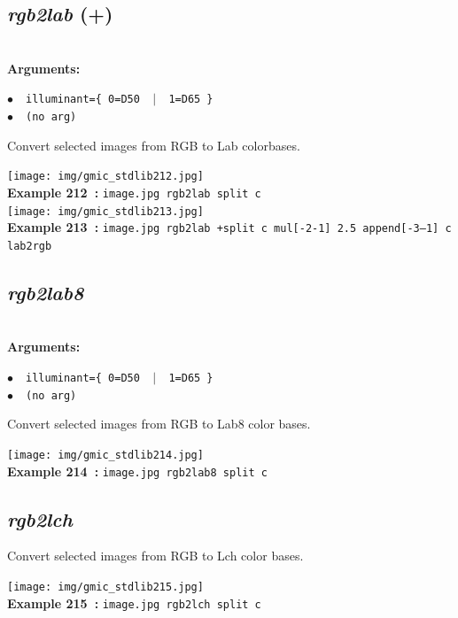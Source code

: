 \documentclass[a4paper,10.5pt,twoside]{book}
\def\comma{\discretionary{,}{}{,}}
\newcommand{\Cb}[1]{\textcolor{cb}{#1}}
\begin{document}
\subsection{\emph{rgb2lab} (+)}\vspace*{-0.7em}
~\\\textbf{\Cb{Arguments: }}\begin{flushleft}
{\small \Cb{\hspace*{0.5cm}$\bullet$~~\texttt{illuminant=\{ 0=D50 ~$|$~ 1=D65 \}}}}~~~\\
{\small \Cb{\hspace*{0.5cm}$\bullet$~~\texttt{(no arg)}}}\end{flushleft}
Convert selected images from RGB to Lab colorbases.
\begin{center}\texttt{[image: img/gmic\_stdlib212.jpg]}\\
{\footnotesize \textbf{Example 212~:} \texttt{image.jpg rgb2lab split c}}
\\\texttt{[image: img/gmic\_stdlib213.jpg]}\\
{\footnotesize \textbf{Example 213~:} \texttt{image.jpg rgb2lab +split c mul[-2{\comma}-1] 2.5 append[-3--1] c lab2rgb}}
\end{center}

\subsection{\emph{rgb2lab8} }\vspace*{-0.7em}
~\\\textbf{\Cb{Arguments: }}\begin{flushleft}
{\small \Cb{\hspace*{0.5cm}$\bullet$~~\texttt{illuminant=\{ 0=D50 ~$|$~ 1=D65 \}}}}~~~\\
{\small \Cb{\hspace*{0.5cm}$\bullet$~~\texttt{(no arg)}}}\end{flushleft}
Convert selected images from RGB to Lab8 color bases.
\begin{center}\texttt{[image: img/gmic\_stdlib214.jpg]}\\
{\footnotesize \textbf{Example 214~:} \texttt{image.jpg rgb2lab8 split c}}
\end{center}

\subsection{\emph{rgb2lch} }\vspace*{-0.7em}
Convert selected images from RGB to Lch color bases.
\begin{center}\texttt{[image: img/gmic\_stdlib215.jpg]}\\
{\footnotesize \textbf{Example 215~:} \texttt{image.jpg rgb2lch split c}}
\end{center}
\end{document}
